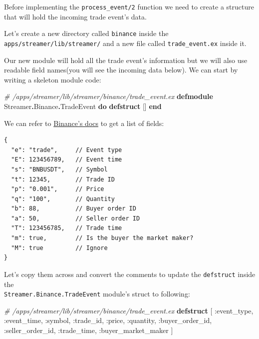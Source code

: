 \documentclass[
  oneside]{book}
\newenvironment{Shaded}{\begin{snugshade}}{\end{snugshade}}
\newcommand{\CommentTok}[1]{\textcolor[rgb]{0.56,0.35,0.01}{\textit{#1}}}
\newcommand{\ConstantTok}[1]{\textcolor[rgb]{0.56,0.35,0.01}{#1}}
\newcommand{\KeywordTok}[1]{\textcolor[rgb]{0.13,0.29,0.53}{\textbf{#1}}}
\newcommand{\NormalTok}[1]{#1}
\newcommand{\OperatorTok}[1]{\textcolor[rgb]{0.81,0.36,0.00}{\textbf{#1}}}
\newcommand{\OtherTok}[1]{\textcolor[rgb]{0.56,0.35,0.01}{#1}}
\newcommand{\VariableTok}[1]{\textcolor[rgb]{0.00,0.00,0.00}{#1}}
\begin{document}
Before implementing the \texttt{process\_event/2} function we need to create a structure that will hold the incoming trade event's data.

Let's create a new directory called \texttt{binance} inside the \texttt{apps/streamer/lib/streamer/} and a new file called \texttt{trade\_event.ex} inside it.

Our new module will hold all the trade event's information but we will also use readable field names(you will see the incoming data below). We can start by writing a skeleton module code:

\begin{Shaded}
\begin{Highlighting}[]
\CommentTok{\# /apps/streamer/lib/streamer/binance/trade\_event.ex}
\KeywordTok{defmodule} \ConstantTok{Streamer}\OperatorTok{.}\ConstantTok{Binance}\OperatorTok{.}\ConstantTok{TradeEvent} \KeywordTok{do}
  \KeywordTok{defstruct} \OtherTok{[]}
\KeywordTok{end}
\end{Highlighting}
\end{Shaded}

We can refer to \href{https://github.com/binance/binance-spot-api-docs/blob/master/web-socket-streams.md\#trade-streams}{Binance's docs} to get a list of fields:

\begin{verbatim}
{
  "e": "trade",     // Event type
  "E": 123456789,   // Event time
  "s": "BNBUSDT",   // Symbol
  "t": 12345,       // Trade ID
  "p": "0.001",     // Price
  "q": "100",       // Quantity
  "b": 88,          // Buyer order ID
  "a": 50,          // Seller order ID
  "T": 123456785,   // Trade time
  "m": true,        // Is the buyer the market maker?
  "M": true         // Ignore
}
\end{verbatim}

Let's copy them across and convert the comments to update the \texttt{defstruct} inside the\\
\texttt{Streamer.Binance.TradeEvent} module's struct to following:

\begin{Shaded}
\begin{Highlighting}[]
  \CommentTok{\# /apps/streamer/lib/streamer/binance/trade\_event.ex}
  \KeywordTok{defstruct} \OtherTok{[}
    \VariableTok{:event\_type}\NormalTok{,}
    \VariableTok{:event\_time}\NormalTok{,}
    \VariableTok{:symbol}\NormalTok{,}
    \VariableTok{:trade\_id}\NormalTok{,}
    \VariableTok{:price}\NormalTok{,}
    \VariableTok{:quantity}\NormalTok{,}
    \VariableTok{:buyer\_order\_id}\NormalTok{,}
    \VariableTok{:seller\_order\_id}\NormalTok{,}
    \VariableTok{:trade\_time}\NormalTok{,}
    \VariableTok{:buyer\_market\_maker}
  \OtherTok{]}
\end{Highlighting}
\end{Shaded}
\end{document}
